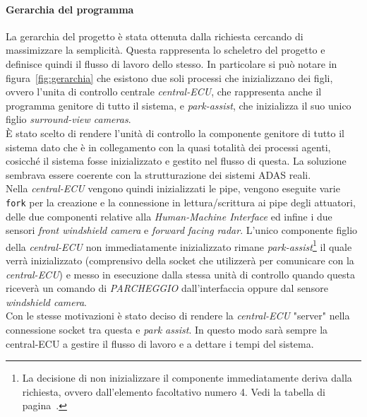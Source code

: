 \documentclass[11pt, openany]{article}
\theoremstyle{definition}
\theoremstyle{plain}
\theoremstyle{remark}
\begin{document}
	\paragraph{Gerarchia del programma}
	La gerarchia del progetto è stata ottenuta dalla richiesta cercando di massimizzare la semplicità.
	Questa rappresenta lo scheletro del progetto e definisce quindi il flusso di lavoro dello stesso. In particolare si può notare in figura~\ref{fig:gerarchia} che esistono due soli processi che inizializzano dei figli, ovvero l'unita di controllo centrale \textit{central-ECU}, che rappresenta anche il programma genitore di tutto il sistema, e \textit{park-assist}, che inizializza il suo unico figlio \textit{surround-view cameras}.\\
	È stato scelto di rendere l'unità di controllo la componente genitore di tutto il sistema dato che è in collegamento con la quasi totalità dei processi agenti, cosicché il sistema fosse inizializzato e gestito nel flusso di questa. La soluzione sembrava essere coerente con la strutturazione dei sistemi ADAS reali.\\
	Nella \textit{central-ECU} vengono quindi inizializzati le pipe, vengono eseguite varie \texttt{fork} per la creazione e la connessione in lettura/scrittura ai pipe degli attuatori, delle due componenti relative alla \textit{Human-Machine Interface} ed infine i due sensori \textit{front windshield camera} e \textit{forward facing radar}. L'unico componente figlio della \textit{central-ECU} non immediatamente inizializzato rimane \textit{park-assist}\footnote{La decisione di non inizializzare il componente immediatamente deriva dalla richiesta, ovvero dall'elemento facoltativo numero 4. Vedi la tabella di pagina~\pageref{tab:facoltativi}.} il quale verrà inizializzato (comprensivo della socket che utilizzerà per comunicare con la \textit{central-ECU}) e messo in esecuzione dalla stessa unità di controllo quando questa riceverà un comando di \textit{PARCHEGGIO} dall'interfaccia oppure dal sensore \textit{windshield camera}.\\
	Con le stesse motivazioni è stato deciso di rendere la \textit{central-ECU} "server" nella connessione socket tra questa e \textit{park assist}. In questo modo sarà sempre la central-ECU a gestire il flusso di lavoro e a dettare i tempi del sistema.
\end{document}
